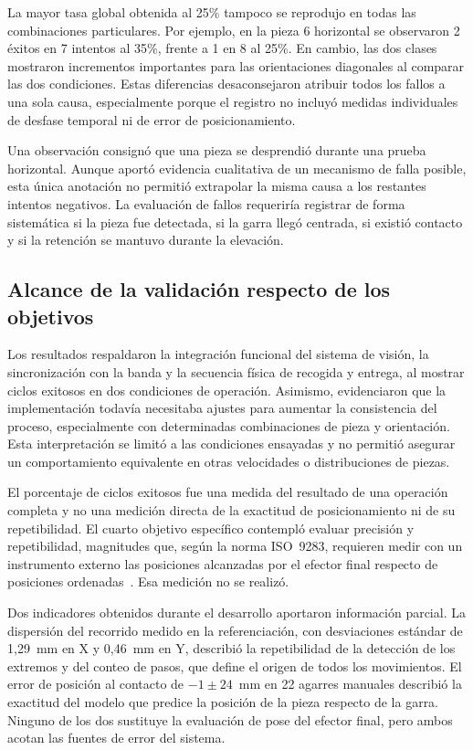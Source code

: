 La mayor tasa global obtenida al 25\% tampoco se reprodujo en todas las combinaciones particulares. Por ejemplo, en la pieza 6 horizontal se observaron 2 éxitos en 7 intentos al 35\%, frente a 1 en 8 al 25\%. En cambio, las dos clases mostraron incrementos importantes para las orientaciones diagonales al comparar las dos condiciones. Estas diferencias desaconsejaron atribuir todos los fallos a una sola causa, especialmente porque el registro no incluyó medidas individuales de desfase temporal ni de error de posicionamiento.

Una observación consignó que una pieza se desprendió durante una prueba horizontal. Aunque aportó evidencia cualitativa de un mecanismo de falla posible, esta única anotación no permitió extrapolar la misma causa a los restantes intentos negativos. La evaluación de fallos requeriría registrar de forma sistemática si la pieza fue detectada, si la garra llegó centrada, si existió contacto y si la retención se mantuvo durante la elevación.

\subsection{Alcance de la validación respecto de los objetivos}

Los resultados respaldaron la integración funcional del sistema de visión, la sincronización con la banda y la secuencia física de recogida y entrega, al mostrar ciclos exitosos en dos condiciones de operación. Asimismo, evidenciaron que la implementación todavía necesitaba ajustes para aumentar la consistencia del proceso, especialmente con determinadas combinaciones de pieza y orientación. Esta interpretación se limitó a las condiciones ensayadas y no permitió asegurar un comportamiento equivalente en otras velocidades o distribuciones de piezas.

El porcentaje de ciclos exitosos fue una medida del resultado de una operación completa y no una medición directa de la exactitud de posicionamiento ni de su repetibilidad. El cuarto objetivo específico contempló evaluar precisión y repetibilidad, magnitudes que, según la norma ISO~9283, requieren medir con un instrumento externo las posiciones alcanzadas por el efector final respecto de posiciones ordenadas~\cite{iso9283}. Esa medición no se realizó.

Dos indicadores obtenidos durante el desarrollo aportaron información parcial. La dispersión del recorrido medido en la referenciación, con desviaciones estándar de 1,29~mm en X y 0,46~mm en Y, describió la repetibilidad de la detección de los extremos y del conteo de pasos, que define el origen de todos los movimientos. El error de posición al contacto de $-1\pm24$~mm en 22 agarres manuales describió la exactitud del modelo que predice la posición de la pieza respecto de la garra. Ninguno de los dos sustituye la evaluación de pose del efector final, pero ambos acotan las fuentes de error del sistema.

